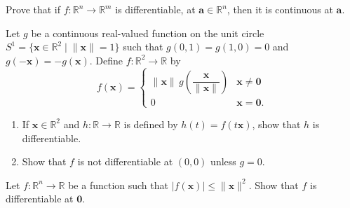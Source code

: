 \documentclass[12 pt, letterpaper]{hmcpset}
\begin{document}
\begin{problem}[1.]
	Prove that if $f : \mathbb{R}^{n} \to \mathbb{R}^{m}$ is differentiable, at $\mathbf{a} \in \mathbb{R}^{n}$, then it is continuous at $\mathbf{a}$.
\end{problem}

\pagebreak

\begin{problem}[4.]
	Let $g$ be a continuous real-valued function on the unit circle $S^{1} = \{ \mathbf{x} \in \mathbb{R}^{2}\mid \lVert \mathbf{x} \rVert = 1 \}$ such that $g(0, 1) = g(1, 0) = 0$ and $g(-\mathbf{x}) = - g(\mathbf{x})$. Define $f : \mathbb{R}^{2} \to \mathbb{R}$ by
	\[
		f(\mathbf{x}) = \begin{cases}
			\lVert \mathbf{x} \rVert \, g \left ( \dfrac{\mathbf{x}}{\lVert \mathbf{x} \rVert} \right ) & \mathbf{x} \neq \mathbf{0} \\
			0 & \mathbf{x} = \mathbf{0}.
		\end{cases}
	\]
	\begin{enumerate}
		\item If $\mathbf{x} \in \mathbb{R}^{2}$ and $h : \mathbb{R} \to \mathbb{R}$ is defined by $h(t) = f(t\mathbf{x})$, show that $h$ is differentiable.
		\item Show that $f$ is not differentiable at $(0, 0)$ unless $g = 0$.
	\end{enumerate}
\end{problem}

\pagebreak

\begin{problem}[7.]
	Let $f : \mathbb{R}^{n} \to \mathbb{R}$ be a function such that $\lvert f(\mathbf{x}) \rvert \le \lVert \mathbf{x} \rVert^{2}$. Show that $f$ is differentiable at $\mathbf{0}$.
\end{problem}

\pagebreak
\end{document}
